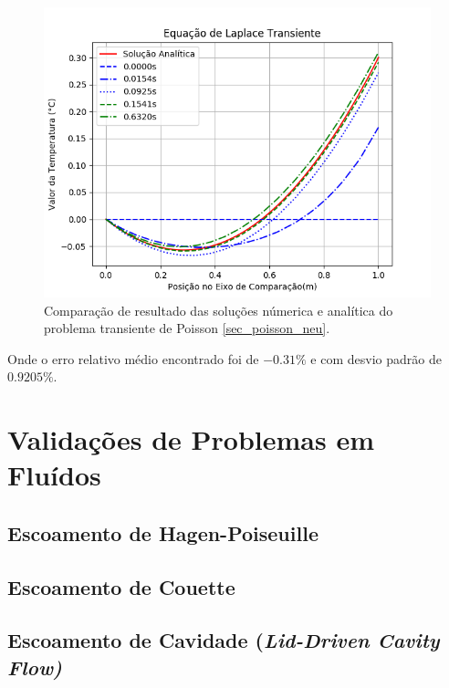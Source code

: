 \begin{figure}[H]
    \centering
    \includegraphics[width=.7\linewidth]{figures/poisson_neumann_transient_comparison.png}
    \caption{Comparação de resultado das soluções númerica e analítica do problema transiente de Poisson \ref{sec_poisson_neu}.}
    \label{poisson_n_trans_comp}
\end{figure}
Onde o erro relativo médio encontrado foi de $-0.31\%$ e com desvio padrão de $0.9205\%$.

\section{\textbf{Validações de Problemas em Fluídos}}
\subsection{\textbf{Escoamento de Hagen-Poiseuille}}
\subsection{\textbf{Escoamento de Couette}}
\subsection{\textbf{Escoamento de Cavidade (\it{Lid-Driven Cavity Flow})}}


